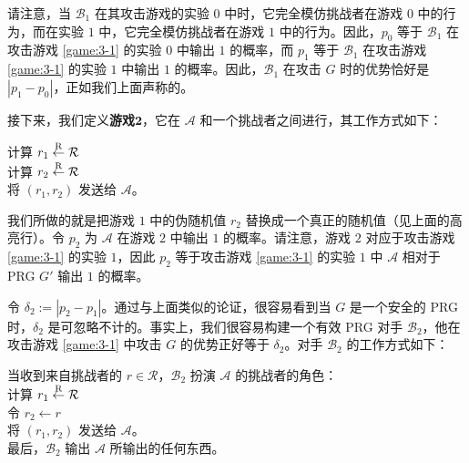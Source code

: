 \vspace*{5pt}

\noindent
请注意，当 $\mathcal B_1$ 在其攻击游戏的实验 $0$ 中时，它完全模仿挑战者在游戏 $0$ 中的行为，而在实验 $1$ 中，它完全模仿挑战者在游戏 $1$ 中的行为。因此，$p_0$ 等于 $\mathcal B_1$ 在攻击游戏 \ref{game:3-1} 的实验 $0$ 中输出 $1$ 的概率，而 $p_1$ 等于 $\mathcal B_1$ 在攻击游戏 \ref{game:3-1} 的实验 $1$ 中输出 $1$ 的概率。因此，$\mathcal B_1$ 在攻击 $G$ 时的优势恰好是 $|p_1-p_0|$，正如我们上面声称的。

接下来，我们定义\textbf{游戏$\mathbf{2}$}，它在 $\mathcal A$ 和一个挑战者之间进行，其工作方式如下：

\vspace*{5pt}

\hspace*{5pt} 计算 $r_1\overset{\rm R}\leftarrow\mathcal R$\\
\hspace*{23pt} \colorbox{gray!50}{计算 $r_2\overset{\rm R}\leftarrow\mathcal R$}\\
\hspace*{26pt} 将 $(r_1,r_2)$ 发送给 $\mathcal A$。

\vspace*{5pt}

\noindent
我们所做的就是把游戏 $1$ 中的伪随机值 $r_2$ 替换成一个真正的随机值（见上面的高亮行）。令 $p_2$ 为 $\mathcal A$ 在游戏 $2$ 中输出 $1$ 的概率。请注意，游戏 $2$ 对应于攻击游戏 \ref{game:3-1} 的实验 $1$，因此 $p_2$ 等于攻击游戏 \ref{game:3-1} 的实验 $1$ 中 $\mathcal A$ 相对于 PRG $G'$ 输出 $1$ 的概率。

令 $\delta_2:=|p_2-p_1|$。通过与上面类似的论证，很容易看到当 $G$ 是一个安全的 PRG 时，$\delta_2$ 是可忽略不计的。事实上，我们很容易构建一个有效 PRG 对手 $\mathcal B_2$，他在攻击游戏 \ref{game:3-1} 中攻击 $G$ 的优势正好等于 $\delta_2$。对手 $\mathcal B_2$ 的工作方式如下：

\vspace*{5pt}

\hspace*{5pt} 当收到来自挑战者的 $r\in\mathcal R$，$\mathcal B_2$ 扮演 $\mathcal A$ 的挑战者的角色：\\
\hspace*{50pt} 计算 $r_1\overset{\rm R}\leftarrow\mathcal R$\\
\hspace*{50pt} 令 $r_2\leftarrow r$\\
\hspace*{50pt} 将 $(r_1,r_2)$ 发送给 $\mathcal A$。\\
\hspace*{26pt} 最后，$\mathcal B_2$ 输出 $\mathcal A$ 所输出的任何东西。

